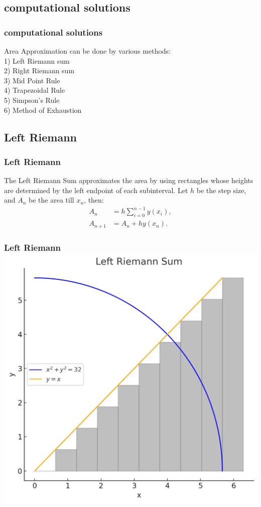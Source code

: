 \documentclass{beamer}
\theoremstyle{remark}
\numberwithin{equation}{section}
\begin{document}
\subsection{computational solutions}
\begin{frame}
\frametitle{computational solutions}

Area Approximation can be done by various methods:\\
	1) Left Riemann sum\\
	2) Right Riemann sum\\
	3) Mid Point Rule\\
	4) Trapezoidal Rule\\
	5) Simpson's Rule\\
	6) Method of Exhaustion

\end{frame}
\subsection{Left Riemann}
\begin{frame}
\frametitle{Left Riemann}
The Left Riemann Sum approximates the area by using rectangles whose heights are determined by the left endpoint of each subinterval. Let \(h\) be the step size, and \(A_n\) be the area till \(x_n\), then:
\begin{align}
    A_n &= h\sum_{i=0}^{n-1} y(x_i),\\
    A_{n+1} &= A_n + h y(x_n).
\end{align}
\frametitle{\hspace{0.5em} Left Riemann \hfill \includegraphics[scale=0.1]{figs/1.png}}

\end{frame}
\end{document}
